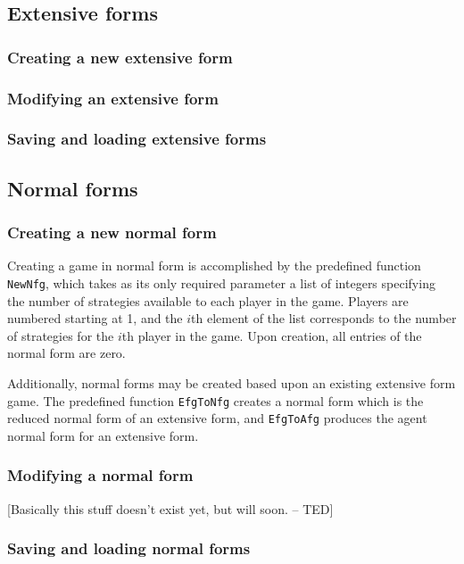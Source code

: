 \subsection{Extensive forms}

\subsubsection{Creating a new extensive form}

\subsubsection{Modifying an extensive form}

\subsubsection{Saving and loading extensive forms}

\subsection{Normal forms}

\subsubsection{Creating a new normal form}

Creating a game in normal form is accomplished by the predefined function
\verb+NewNfg+, which takes as its only required parameter a list of integers
specifying the number of strategies available to each player in the game.
Players are numbered starting at 1, and the $i$th element of the list
corresponds to the number of strategies for the $i$th player in the game.
Upon creation, all entries of the normal form are zero.

Additionally, normal forms may be created based upon an existing extensive
form game.  The predefined function \verb+EfgToNfg+ creates a normal form
which is the reduced normal form of an extensive form, and \verb+EfgToAfg+
produces the agent normal form for an extensive form.

\subsubsection{Modifying a normal form}

[Basically this stuff doesn't exist yet, but will soon. -- TED]

\subsubsection{Saving and loading normal forms}

